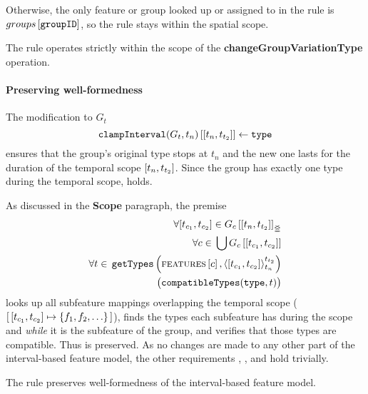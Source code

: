 Otherwise, the only feature or group looked up or assigned to in the rule is $groups \left[ \texttt{groupID} \right]$, so the rule stays within the spatial scope.
\\

\begin{lemma}
   The  rule operates strictly within the scope of the \textbf{changeGroupVariationType} operation.
   \label{lemma:change-group-variation-type-scope}
\end{lemma}

\paragraph{Preserving well-formedness}

The modification to $G_t$
\[
   \lookup{\var{clampInterval}(G_t, t_n)}{\interval{t_n}{t_{t_2}}} \assign \var{type}
\]
ensures that the group's original type stops at $t_n$ and the new one lasts for the duration of the temporal scope $\interval{t_n}{t_{t_2}}$. Since the group has exactly one type during the temporal scope,  holds.

As discussed in the \textbf{Scope} paragraph, the premise 
\[
   \begin{split}
        \forall \interval{t_{c_1}}{t_{c_2}} \in \overlapping{G_c}{t_n}{t_{t_2}}\\ %
        \forall c \in \, \bigcup \lookup{G_c}{\interval{t_{c_1}}{t_{c_2}}}\\ %
        \forall t \in \, \var{getTypes}\left(\lookup{\features}{c}, \clamp{\interval{t_{c_1}}{t_{c_2}}}{t_n}{t_{t_2}}\right) \\ %
        \big(\var{compatibleTypes}(\var{type}, t)\big)
   \end{split}
\]
looks up all subfeature mappings overlapping the temporal scope ($\intervalmapping{t_{c_1}}{t_{c_2}}{\set{f_1, f_2, \ldots}}$), finds the types each subfeature has during the scope and \emph{while} it is the subfeature of the group, and verifies that those types are compatible. Thus  is preserved. 
As no changes are made to any other part of the interval-based feature model, the other requirements , , and  hold trivially.
\\

\begin{lemma}
   The  rule preserves well-formedness of the interval-based feature model. 
   \label{lemma:change-group-variation-type-well-formed}
\end{lemma}

